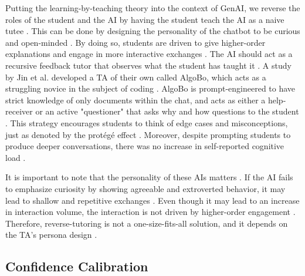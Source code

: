 \documentclass{article}
\begin{document}
Putting the learning-by-teaching theory into the context of GenAI, 
we reverse the roles of the student and the AI by having the student teach the AI as a naive tutee \cite{Mollick2023}. 
This can be done by designing the personality of the chatbot to be curious and open-minded \cite{Lyu2025}.
By doing so, students are driven to give higher-order explanations and engage in more interactive exchanges \cite{Lyu2025}. 
The AI should act as a recursive feedback tutor that observes what the student has taught it \cite{Okita2013}. 
A study by Jin et al. developed a TA of their own called AlgoBo, which acts 
as a struggling novice in the subject of coding \cite{Jin2024}. AlgoBo is prompt-engineered to 
have strict knowledge of only documents within the chat, and acts as either a help-receiver or 
an active "questioner" that asks why and how questions to the student \cite{Jin2024}. 
This strategy encourages students to think of edge cases and misconceptions, just as denoted by 
the protégé effect \cite{Fiorella2023,Jin2024}.
Moreover, despite prompting students to produce deeper conversations, 
there was no increase in self-reported cognitive load \cite{Jin2024}. 

It is important to note that the personality of these AIs matters \cite{Lyu2025}. 
If the AI fails to emphasize curiosity by showing agreeable and extroverted behavior, 
it may lead to shallow and repetitive exchanges \cite{Lyu2025}. 
Even though it may lead to an increase in interaction volume, the interaction is not driven 
by higher-order engagement \cite{Lyu2025}. 
Therefore, reverse-tutoring is not a one-size-fits-all solution, 
and it depends on the TA's persona design \cite{Lyu2025}.

\subsection{Confidence Calibration}
\end{document}
